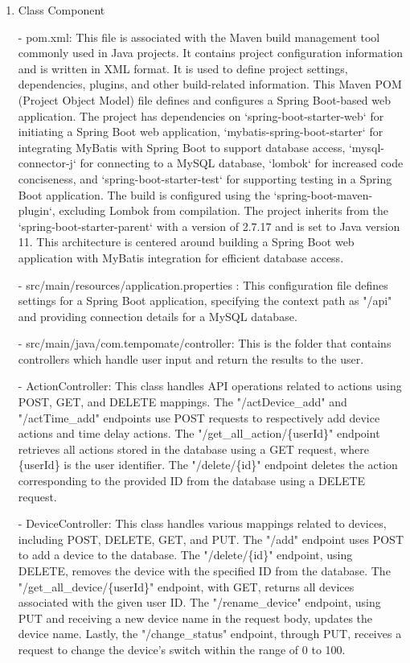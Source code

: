 \begin{enumerate}
\begin{enumerate}
          \end{enumerate}
    \item Class Component \\
    \item[-] pom.xml: This file is associated with the Maven build management tool commonly used in Java projects. It contains project configuration information and is written in XML format. It is used to define project settings, dependencies, plugins, and other build-related information. This Maven POM (Project Object Model) file defines and configures a Spring Boot-based web application. The project has dependencies on `spring-boot-starter-web` for initiating a Spring Boot web application, `mybatis-spring-boot-starter` for integrating MyBatis with Spring Boot to support database access, `mysql-connector-j` for connecting to a MySQL database, `lombok` for increased code conciseness, and `spring-boot-starter-test` for supporting testing in a Spring Boot application. The build is configured using the `spring-boot-maven-plugin`, excluding Lombok from compilation. The project inherits from the `spring-boot-starter-parent` with a version of 2.7.17 and is set to Java version 11. This architecture is centered around building a Spring Boot web application with MyBatis integration for efficient database access. \\
    \item[-] src/main/resources/application.properties : This configuration file defines settings for a Spring Boot application, specifying the context path as "/api" and providing connection details for a MySQL database.\\
    \item[-] src/main/java/com.tempomate/controller: This is the folder that contains controllers which handle user input and return the results to the user. \\
    \item[-] ActionController: This class handles API operations related to actions using POST, GET, and DELETE mappings. The "/actDevice\_add" and "/actTime\_add" endpoints use POST requests to respectively add device actions and time delay actions. The "/get\_all\_action/\{userId\}" endpoint retrieves all actions stored in the database using a GET request, where \{userId\} is the user identifier. The "/delete/\{id\}" endpoint deletes the action corresponding to the provided ID from the database using a DELETE request.\\
    \item[-] DeviceController: This class handles various mappings related to devices, including POST, DELETE, GET, and PUT. The "/add" endpoint uses POST to add a device to the database. The "/delete/\{id\}" endpoint, using DELETE, removes the device with the specified ID from the database. The "/get\_all\_device/\{userId\}" endpoint, with GET, returns all devices associated with the given user ID. The "/rename\_device" endpoint, using PUT and receiving a new device name in the request body, updates the device name. Lastly, the "/change\_status" endpoint, through PUT, receives a request to change the device's switch within the range of 0 to 100. \\

\end{enumerate}
